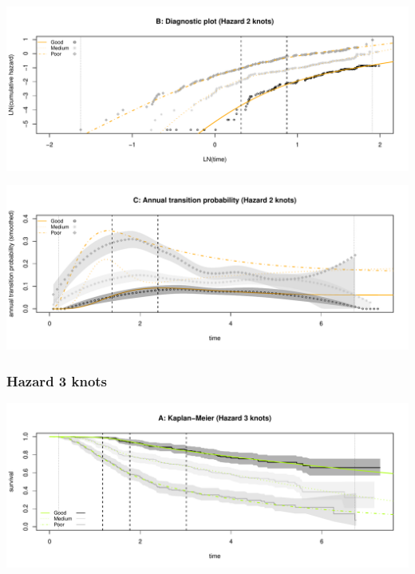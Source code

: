 \documentclass[
]{article}
\begin{document}
\begin{flushleft}\includegraphics[height=0.25\textheight]{BC_OS_output/Images/Figure_spline_models-5} \end{flushleft}

\begin{flushleft}\includegraphics[height=0.25\textheight]{BC_OS_output/Images/Figure_spline_models-6} \end{flushleft}

\clearpage

\subsubsection{Hazard 3 knots}\label{hazard-3-knots}

\begin{flushleft}\includegraphics[height=0.25\textheight]{BC_OS_output/Images/Figure_spline_models-7} \end{flushleft}
\end{document}
